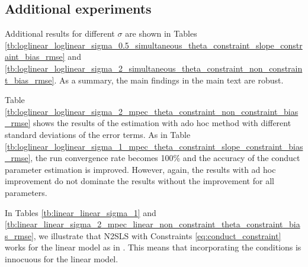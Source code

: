\documentclass[11pt, a4paper]{article}
\theoremstyle{remark}
\begin{document}




\subsection{Additional experiments}\label{sec:additional_experiments}

Additional results for different $\sigma$ are shown in Tables \ref{tb:loglinear_loglinear_sigma_0.5_simultaneous_theta_constraint_slope_constraint_bias_rmse} and \ref{tb:loglinear_loglinear_sigma_2_simultaneous_theta_constraint_non_constraint_bias_rmse}. 
As a summary, the main findings in the main text are robust.
 
Table \ref{tb:loglinear_loglinear_sigma_2_mpec_theta_constraint_non_constraint_bias_rmse} shows the results of the estimation with ado hoc method with different standard deviations of the error terms.
As in Table \ref{tb:loglinear_loglinear_sigma_1_mpec_theta_constraint_slope_constraint_bias_rmse}, the run convergence rate becomes 100\% and the accuracy of the conduct parameter estimation is improved.
However, again, the results with ad hoc improvement do not dominate the results without the improvement for all parameters.

In Tables \ref{tb:linear_linear_sigma_1} and  \ref{tb:linear_linear_sigma_2_mpec_linear_non_constraint_theta_constraint_bias_rmse}, we illustrate that N2SLS with Constraints \eqref{eq:conduct_constraint} works for the linear model as in \cite{matsumura2023resolving}. 
This means that incorporating the conditions is innocuous for the linear model. 
\end{document}
